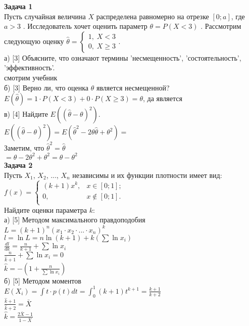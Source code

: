 \documentclass[pdftex,12pt,a4paper]{article}
\begin{document}
{\bf Задача 1} \\
Пусть случайная величина  $X$  распределена
равномерно на отрезке $\left[0;a\right]$, где  $a>3$ .
Исследователь хочет оценить параметр  $\theta =P\left(X<3\right)$
. Рассмотрим следующую оценку $\hat{\theta
}=\left\{\begin{array}{l} {1,\; X<3} \\ {0,\; X\ge 3}
\end{array}\right. $. \\
а) [3] Объясните, что означают термины 'несмещенность',
'состоятельность', 'эффективность'. \\
смотрим учебник \\
б) [3] Верно ли, что оценка $\hat{\theta}$ является несмещенной? \\
$E(\hat{\theta})=1\cdot P(X<3)+0\cdot P(X \ge 3)=\theta$, да
является \\
 в) [4] Найдите $E\left(\left(\hat{\theta }-\theta \right)^{2}
\right)$. \\
$E\left(\left(\hat{\theta }-\theta \right)^{2} \right)=
E\left(\hat{\theta}^{2}-2\theta\hat{\theta}+\theta^{2}\right)=$ \\
Заметим, что $\hat{\theta}^{2}=\hat{\theta}$ \\
$=\theta-2\theta^{2}+\theta^{2}=\theta-\theta^{2}$ \\


{\bf Задача 2} \\
Пусть $X_{1}$, $X_{2}$, ..., $X_{n}$ независимы и их функции
плотности имеет вид: \\
$ f(x)=
\left\{%
\begin{array}{ll}
    (k+1)x^{k}, & x \in [0;1]; \\
    0, & x \notin [0;1]. \\
\end{array}%
\right.     $ \\
Найдите оценки параметра $k$: \\
а) [5] Методом максимального правдоподобия \\
$L=(k+1)^{n}(x_{1}\cdot x_{2} \cdot...\cdot x_{n})^{k}$ \\
$l=\ln{L}=n\ln(k+1)+k(\sum \ln{x_{i}})$ \\
$\frac{dl}{dk}=\frac{n}{k+1}+\sum \ln{x_{i}}$ \\
$\frac{n}{\hat{k}+1}+\sum \ln{x_{i}}=0$ \\
$\hat{k}=-\left(1+\frac{n}{\sum \ln{x_{i}}} \right)$ \\
б) [5] Методом моментов \\
$E(X_{i})=\int t\cdot p(t)dt=\int_{0}^{1}
(k+1)t^{k+1}=\frac{k+1}{k+2}$ \\
$\frac{\hat{k}+1}{\hat{k}+2}=\bar{X}$ \\
$\hat{k}=\frac{2\bar{X}-1}{1-\bar{X}}$ \\
\end{document}
